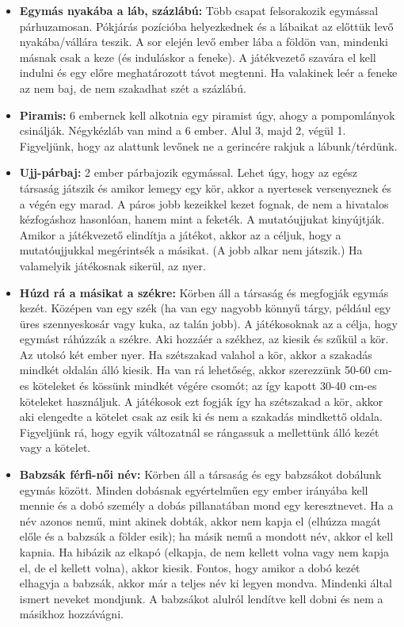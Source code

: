 \documentclass[a4paper, 12pt, twoside, openright]{article}
\begin{document}
\begin{itemize}
\item \textbf{Egymás nyakába a láb, százlábú:} Több csapat felsorakozik egymással párhuzamosan. Pókjárás pozícióba helyezkednek és a lábaikat az előttük levő nyakába/vállára teszik. A sor elején levő ember lába a földön van, mindenki másnak csak a keze (és induláskor a feneke). A játékvezető szavára el kell indulni és egy előre meghatározott távot megtenni. Ha valakinek leér a feneke az nem baj, de nem szakadhat szét a százlábú.

\item \textbf{Piramis:} 6 embernek kell alkotnia egy piramist úgy, ahogy a pompomlányok csinálják. Négykézláb van mind a 6 ember. Alul 3, majd 2, végül 1. Figyeljünk, hogy az alattunk levőnek ne a gerincére rakjuk a lábunk/térdünk. 

\item \textbf{Ujj-párbaj:} 2 ember párbajozik egymással. Lehet úgy, hogy az egész társaság játszik és amikor lemegy egy kör, akkor a nyertesek versenyeznek és a végén egy marad. A páros jobb kezeikkel kezet fognak, de nem a hivatalos kézfogáshoz hasonlóan, hanem mint a feketék. A mutatóujjukat kinyújtják. Amikor a játékvezető elindítja a játékot, akkor az a céljuk, hogy a mutatóujjukkal megérintsék a másikat. (A jobb alkar nem játszik.) Ha valamelyik játékosnak sikerül, az nyer.

\item \textbf{Húzd rá a másikat a székre:} Körben áll a társaság és megfogják egymás kezét. Középen van egy szék (ha van egy nagyobb könnyű tárgy, például egy üres szennyeskosár vagy kuka, az talán jobb). A játékosoknak az a célja, hogy egymást ráhúzzák a székre. Aki hozzáér a székhez, az kiesik és szűkül a kör. Az utolsó két ember nyer. Ha szétszakad valahol a kör, akkor a szakadás mindkét oldalán álló kiesik. Ha van rá lehetőség, akkor szerezzünk 50-60 cm-es köteleket és kössünk mindkét végére csomót; az így kapott 30-40 cm-es köteleket használjuk. A játékosok ezt fogják így ha szétszakad a kör, akkor aki elengedte a kötelet csak az esik ki és nem a szakadás mindkettő oldala. Figyeljünk rá, hogy egyik változatnál se rángassuk a mellettünk álló kezét vagy a kötelet.

\item \textbf{Babzsák férfi-női név:} Körben áll a társaság és egy babzsákot dobálunk egymás között. Minden dobásnak egyértelműen egy ember irányába kell mennie és a dobó személy a dobás pillanatában mond egy keresztnevet. Ha a név azonos nemű, mint akinek dobták, akkor nem kapja el (elhúzza magát előle és a babzsák a földer esik); ha másik nemű a mondott név, akkor el kell kapnia. Ha hibázik az elkapó (elkapja, de nem kellett volna vagy nem kapja el, de el kellett volna), akkor kiesik. Fontos, hogy amikor a dobó kezét elhagyja a babzsák, akkor már a teljes név ki legyen mondva. Mindenki által ismert neveket mondjunk. A babzsákot alulról lendítve kell dobni és nem a másikhoz hozzávágni.


\end{itemize}
\end{document}
